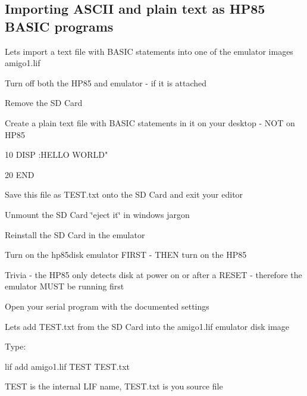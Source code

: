 \subsection*{Importing A\+S\+C\+II and plain text as H\+P85 B\+A\+S\+IC programs}


\begin{DoxyItemize}
\item Lets import a text file with B\+A\+S\+IC statements into one of the emulator images amigo1.\+lif
\item Turn off both the H\+P85 and emulator -\/ if it is attached
\begin{DoxyItemize}
\item Remove the SD Card
\end{DoxyItemize}
\item Create a plain text file with B\+A\+S\+IC statements in it on your desktop -\/ N\+OT on H\+P85
\begin{DoxyItemize}
\item 10 D\+I\+SP \+:H\+E\+L\+LO W\+O\+R\+LD"
\item 20 E\+ND
\end{DoxyItemize}
\end{DoxyItemize}

Save this file as T\+E\+S\+T.\+txt onto the SD Card and exit your editor
\begin{DoxyItemize}
\item Unmount the SD Card \char`\"{}eject it\char`\"{} in windows jargon
\item Reinstall the SD Card in the emulator
\end{DoxyItemize}

Turn on the hp85disk emulator F\+I\+R\+ST -\/ T\+H\+EN turn on the H\+P85
\begin{DoxyItemize}
\item Trivia -\/ the H\+P85 only detects disk at power on or after a R\+E\+S\+ET -\/ therefore the emulator M\+U\+ST be running first
\begin{DoxyItemize}
\item Open your serial program with the documented settings
\end{DoxyItemize}
\end{DoxyItemize}

Lets add T\+E\+S\+T.\+txt from the SD Card into the amigo1.\+lif emulator disk image
\begin{DoxyItemize}
\item Type\+:
\begin{DoxyItemize}
\item lif add amigo1.\+lif T\+E\+ST T\+E\+S\+T.\+txt
\begin{DoxyItemize}
\item T\+E\+ST is the internal L\+IF name, T\+E\+S\+T.\+txt is you source file
\end{DoxyItemize}
\end{DoxyItemize}
\end{DoxyItemize}

